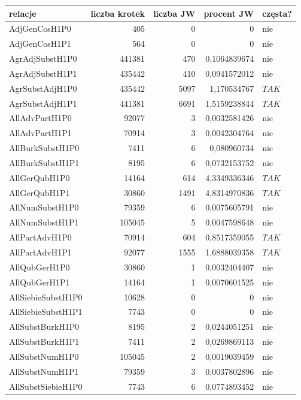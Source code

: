 \documentclass[11pt,a4paper]{llncs}
\begin{document}
\begin{table}[h!]
\centering
\footnotesize\setlength{\tabcolsep}{2.5pt}
\begin{tabular}{ l | r | r | r | l }
	\toprule
	\textbf{relacje} 	& \textbf{liczba krotek} & \textbf{liczba JW} & \textbf{procent JW} & \textbf{częsta?} 	\\
	\midrule
	AdjGenCosH1P0	&	405	&	0	&	0	&	nie	\\
	AdjGenCosH1P1	&	564	&	0	&	0	&	nie	\\
	AgrAdjSubstH1P0	&	441381	&	470	&	0,1064839674	&	nie	\\
	AgrAdjSubstH1P1	&	435442	&	410	&	0,0941572012	&	nie	\\
	AgrSubstAdjH1P0	&	435442	&	5097	&	1,170534767	&	$ TAK $	\\
	AgrSubstAdjH1P1	&	441381	&	6691	&	1,5159238844	&	$ TAK $	\\
	AllAdvPartH1P0	&	92077	&	3	&	0,0032581426	&	nie	\\
	AllAdvPartH1P1	&	70914	&	3	&	0,0042304764	&	nie	\\
	AllBurkSubstH1P0	&	7411	&	6	&	0,080960734	&	nie	\\
	AllBurkSubstH1P1	&	8195	&	6	&	0,0732153752	&	nie	\\
	AllGerQubH1P0	&	14164	&	614	&	4,3349336346	&	$ TAK $	\\
	AllGerQubH1P1	&	30860	&	1491	&	4,8314970836	&	$ TAK $	\\
	AllNumSubstH1P0	&	79359	&	6	&	0,0075605791	&	nie	\\
	AllNumSubstH1P1	&	105045	&	5	&	0,0047598648	&	nie	\\
	AllPartAdvH1P0	&	70914	&	604	&	0,8517359055	&	$ TAK $	\\
	AllPartAdvH1P1	&	92077	&	1555	&	1,6888039358	&	$ TAK $	\\
	AllQubGerH1P0	&	30860	&	1	&	0,0032404407	&	nie	\\
	AllQubGerH1P1	&	14164	&	1	&	0,0070601525	&	nie	\\
	AllSiebieSubstH1P0	&	10628	&	0	&	0	&	nie	\\
	AllSiebieSubstH1P1	&	7743	&	0	&	0	&	nie	\\
	AllSubstBurkH1P0	&	8195	&	2	&	0,0244051251	&	nie	\\
	AllSubstBurkH1P1	&	7411	&	2	&	0,0269869113	&	nie	\\
	AllSubstNumH1P0	&	105045	&	2	&	0,0019039459	&	nie	\\
	AllSubstNumH1P1	&	79359	&	3	&	0,0037802896	&	nie	\\
	AllSubstSiebieH1P0	&	7743	&	6	&	0,0774893452	&	nie	\\

\end{tabular}
\end{table}
\end{document}
